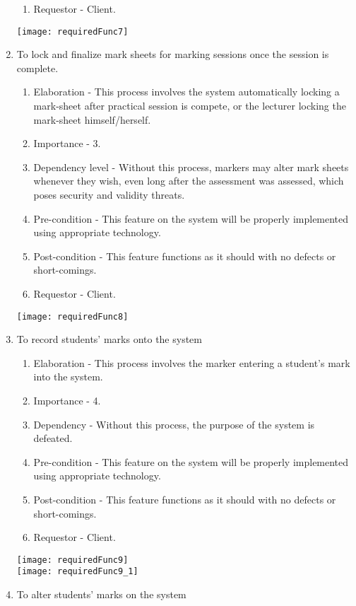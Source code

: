 \documentclass[12pt, a4paper]{scrartcl}
\begin{document}
\begin{enumerate}
\begin{enumerate}
						\item Requestor - Client.
					\end{enumerate}
					\texttt{[image: requiredFunc7]}
					\item To lock and finalize mark sheets for marking sessions once the session is complete.
					\begin{enumerate}
						\item Elaboration - This process involves the system automatically locking a mark-sheet after practical session is compete, or the lecturer locking the mark-sheet himself/herself.
						\item Importance - 3.
						\item Dependency level - Without this process, markers may alter mark sheets whenever they wish, even long after the assessment was assessed, which poses security and validity threats.
						\item Pre-condition - This feature on the system will be properly implemented using appropriate technology.
						\item Post-condition - This feature functions as it should with no defects or short-comings.
						\item Requestor - Client.
					\end{enumerate}
					\texttt{[image: requiredFunc8]}
					\item To record students’ marks onto the system
					\begin{enumerate}
						\item Elaboration - This process involves the marker entering a student’s mark into the system.
						\item Importance - 4.
						\item Dependency - Without this process, the purpose of the system is defeated.
						\item Pre-condition - This feature on the system will be properly implemented using appropriate technology.
						\item Post-condition - This feature functions as it should with no defects or short-comings.
						\item Requestor - Client.
					\end{enumerate}
					\texttt{[image: requiredFunc9]}\\
					\texttt{[image: requiredFunc9\_1]}
					\pagebreak
					\item To alter students’ marks on the system
					\begin{enumerate}

\end{enumerate}
\end{enumerate}
\end{document}
